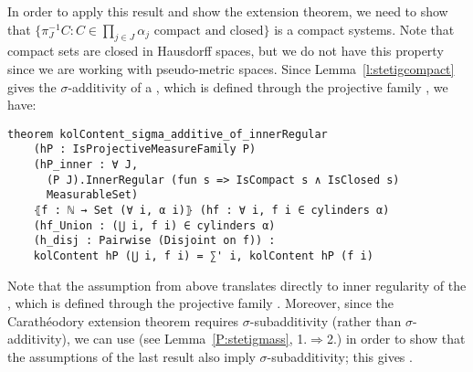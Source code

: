 \documentclass[lean]{DraftAFM}
\begin{document}

In order to apply this result and show the extension theorem, we need
to show that
$\{\pi_J^{-1} C: C \in \prod_{j\in J} \alpha_j \text{ compact and
  closed}\}$ is a compact systems. Note that compact sets are closed
in Hausdorff spaces, but we do not have this property since we are
working with pseudo-metric spaces. Since Lemma~\ref{l:stetigcompact}
gives the $\sigma$-additivity of a , which
is defined through the projective family , we have:

\begin{verbatim}
theorem kolContent_sigma_additive_of_innerRegular
    (hP : IsProjectiveMeasureFamily P)
    (hP_inner : ∀ J,
      (P J).InnerRegular (fun s => IsCompact s ∧ IsClosed s)
      MeasurableSet)
    ⦃f : ℕ → Set (∀ i, α i)⦄ (hf : ∀ i, f i ∈ cylinders α)
    (hf_Union : (⋃ i, f i) ∈ cylinders α)
    (h_disj : Pairwise (Disjoint on f)) :
    kolContent hP (⋃ i, f i) = ∑' i, kolContent hP (f i)
\end{verbatim}

Note that the assumption  from above translates
directly to inner regularity of the , which
is defined through the projective family . Moreover, since
the Carathéodory extension theorem requires $\sigma$-subadditivity
(rather than $\sigma$-additivity), we can use
 (see
  Lemma~\ref{P:stetigmass}, 1.$\Rightarrow$2.) in order to show that
the assumptions of the last result also imply $\sigma$-subadditivity;
this gives
.

\end{document}
